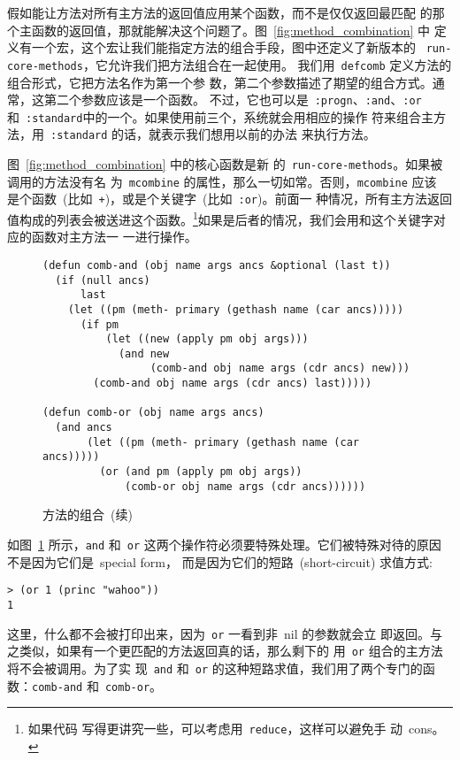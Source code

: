 假如能让方法对所有主方法的返回值应用某个函数，而不是仅仅返回最匹配
的那个主函数的返回值，那就能解决这个问题了。图~\ref{fig:method_combination} 中
定义有一个宏，这个宏让我们能指定方法的组合手段，图中还定义了新版本的
~\texttt{run-core-methods}，它允许我们把方法组合在一起使用。
我们用~\texttt{defcomb} 定义方法的组合形式，它把方法名作为第一个参
数，第二个参数描述了期望的组合方式。通常，这第二个参数应该是一个函数。
不过，它也可以是~\texttt{:progn}、\texttt{:and}、\texttt{:or} 
和~\texttt{:standard}中的一个。如果使用前三个，系统就会用相应的操作
符来组合主方法，用~\texttt{:standard} 的话，就表示我们想用以前的办法
来执行方法。

图~\ref{fig:method_combination} 中的核心函数是新
的~\texttt{run-core-methods}。如果被调用的方法没有名
为~\texttt{mcombine} 的属性，那么一切如常。否则，\texttt{mcombine} 应该
是个函数~(比如~\texttt{+})，或是个关键字~(比如~\texttt{:or})。前面一
种情况，所有主方法返回值构成的列表会被送进这个函数。\footnote{如果代码
  写得更讲究一些，可以考虑用~\texttt{reduce}，这样可以避免手
  动~cons。}如果是后者的情况，我们会用和这个关键字对应的函数对主方法一
一进行操作。
\begin{figure}
\begin{lstlisting}
(defun comb-and (obj name args ancs &optional (last t))
  (if (null ancs)
      last
    (let ((pm (meth- primary (gethash name (car ancs)))))
      (if pm
          (let ((new (apply pm obj args)))
            (and new
                 (comb-and obj name args (cdr ancs) new)))
        (comb-and obj name args (cdr ancs) last)))))

(defun comb-or (obj name args ancs)
  (and ancs
       (let ((pm (meth- primary (gethash name (car ancs)))))
         (or (and pm (apply pm obj args))
             (comb-or obj name args (cdr ancs))))))
\end{lstlisting}
\caption{\label{fig:method_combination_cont}方法的组合~(续)}
\end{figure}

如图~\ref{fig:method_combination_cont} 所示，\texttt{and} 和~\texttt{or}
这两个操作符必须要特殊处理。它们被特殊对待的原因不是因为它们是~special form，
而是因为它们的短路~(short-circuit) 求值方式:
\begin{lstlisting}
> (or 1 (princ "wahoo"))
1
\end{lstlisting}
这里，什么都不会被打印出来，因为~\texttt{or} 一看到非~nil 的参数就会立
即返回。与之类似，如果有一个更匹配的方法返回真的话，那么剩下的
用~\texttt{or} 组合的主方法将不会被调用。为了实
现~\texttt{and} 和~\texttt{or} 的这种短路求值，我们用了两个专门的函
数：\texttt{comb-and} 和~\texttt{comb-or}。

